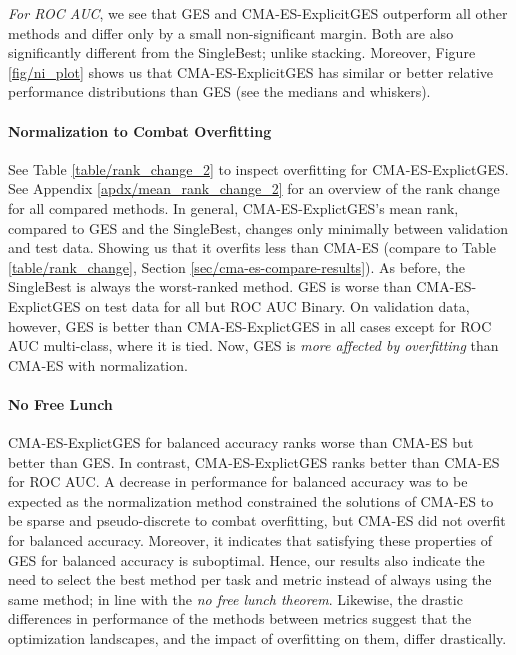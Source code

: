 \documentclass[11pt]{article}
\newcommand{\nbc}[3]{
		{\colorbox{#3}{\bfseries\sffamily\scriptsize\textcolor{white}{#1}}}
		{\textcolor{#3}{\sf\small$\blacktriangleright$\textit{#2}$\blacktriangleleft$}}
}
\newcommand{\changed}[1]{\nbc{CHANGED}{#1}{changedcolor}}
\renewcommand{\changed}[1]{{\color{changedcolor}#1}}
\renewcommand{\changed}[1]{{#1}}
\begin{document}
\emph{For ROC AUC}, we see that GES and CMA-ES-ExplicitGES outperform all other methods and differ only by a small non-significant margin. 
Both are also significantly different from the SingleBest; unlike stacking. 
Moreover, Figure \ref{fig/ni_plot} shows us that CMA-ES-ExplicitGES has similar or better relative performance distributions than GES (see the medians and whiskers).  

\paragraph{Normalization to Combat Overfitting}
See Table \ref{table/rank_change_2} to inspect overfitting for CMA-ES-ExplictGES. \changed{See Appendix \ref{apdx/mean_rank_change_2} for an overview of the rank change for all compared methods.} 
In general, CMA-ES-ExplictGES's mean rank, compared to GES and the SingleBest, changes only minimally between validation and test data. 
Showing us that it overfits less than CMA-ES (compare to Table \ref{table/rank_change}, Section \ref{sec/cma-es-compare-results}).  
As before, the SingleBest is always the worst-ranked method. 
GES is worse than CMA-ES-ExplictGES on test data for all but ROC AUC Binary. 
On validation data, however, GES is better than CMA-ES-ExplictGES in all cases except for ROC AUC multi-class, where it is tied. 
Now, GES is \emph{more affected by overfitting} than CMA-ES with normalization.

\changed{
\paragraph{No Free Lunch} CMA-ES-ExplictGES for balanced accuracy ranks worse than CMA-ES but better than GES. In contrast, CMA-ES-ExplictGES ranks better than CMA-ES for ROC AUC.   
A decrease in performance for balanced accuracy was to be expected as the normalization method constrained the solutions of CMA-ES to be sparse and pseudo-discrete to combat overfitting, but CMA-ES did not overfit for balanced accuracy.
Moreover, it indicates that satisfying these properties of GES for balanced accuracy is suboptimal. 
Hence, our results also indicate the need to select the best method per task and metric instead of always using the same method; in line with the \emph{no free lunch theorem}. 
Likewise, the drastic differences in performance of the methods between metrics suggest that the optimization landscapes, and the impact of overfitting on them, differ drastically. 
}
\end{document}
